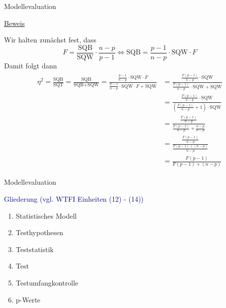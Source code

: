 \documentclass[
  8pt,
  ignorenonframetext,
]{beamer}
\begin{document}
\begin{frame}{Modellevaluation}
\protect\hypertarget{modellevaluation-12}{}
\footnotesize
{}

\underline{Beweis}

Wir halten zunächst fest, dass \begin{equation}
F = \frac{\mbox{SQB}}{\mbox{SQW}}\cdot \frac{n-p}{p-1} 
\Leftrightarrow 
\mbox{SQB} = \frac{p-1}{n-p}\cdot \mbox{SQW} \cdot F
\end{equation} Damit folgt dann \begin{align}
\begin{split}
\eta^2
  = \frac{\mbox{SQB}}{\mbox{SQT}}  
  = \frac{\mbox{SQB}}{\mbox{SQB}+\mbox{SQW}}  
  = \frac{\frac{p-1}{n-p}\cdot \mbox{SQW} \cdot F}{\frac{p-1}{n-p}\cdot \mbox{SQW} \cdot F +\mbox{SQW}}  
& = \frac{\frac{F(p-1)}{n-p}\cdot \mbox{SQW} }{\frac{F(p-1)}{n-p}\cdot \mbox{SQW}  +\mbox{SQW}} \\
& = \frac{\frac{F(p-1)}{n-p}\cdot \mbox{SQW} }{\left(\frac{F(p-1)}{n-p} + 1 \right)\cdot \mbox{SQW}} \\
& = \frac{\frac{F(p-1)}{n-p}}{\frac{F(p-1)}{n-p} + \frac{n-p}{n-p}} \\
& = \frac{\frac{F(p-1)}{n-p}}{\frac{F(p-1) + (n-p)}{n-p}} \\
& = \frac{F(p-1)}{F(p-1)+(n-p)}
\end{split}
\end{align}
\end{frame}

\begin{frame}{Modellevaluation}
\protect\hypertarget{modellevaluation-13}{}

\textcolor{darkblue}{Gliederung (vgl. WTFI Einheiten (12) - (14))}

\begin{enumerate}
[(1)]
\item
  Statistisches Modell \checkmark
\item
  Testhypothesen \checkmark
\item
  Teststatistik \checkmark
\item
  Test
\item
  Testumfangkontrolle
\item
  p-Werte
\end{enumerate}
\end{frame}
\end{document}
